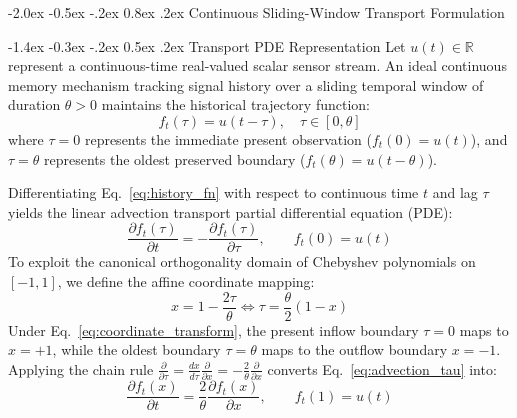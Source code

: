 \documentclass[10pt,twocolumn,a4paper]{article}
\makeatletter
\renewcommand\section{\@startsection{section}{1}{\z@}%
  {-2.0ex \@plus -0.5ex \@minus -.2ex}%
  {0.8ex \@plus .2ex}%
  {\normalfont\large\bfseries}}
\renewcommand\subsection{\@startsection{subsection}{2}{\z@}%
  {-1.4ex \@plus -0.3ex \@minus -.2ex}%
  {0.5ex \@plus .2ex}%
  {\normalfont\normalsize\bfseries}}
\theoremstyle{plain}
\theoremstyle{definition}
\makeatother
\begin{document}
\section{Continuous Sliding-Window Transport Formulation}

\subsection{Transport PDE Representation}
Let $u(t) \in \mathbb{R}$ represent a continuous-time real-valued scalar sensor stream. An ideal continuous memory mechanism tracking signal history over a sliding temporal window of duration $\theta > 0$ maintains the historical trajectory function:
\begin{equation}
f_t(\tau) = u(t - \tau), \quad \tau \in [0, \theta]
\label{eq:history_fn}
\end{equation}
where $\tau = 0$ represents the immediate present observation ($f_t(0) = u(t)$), and $\tau = \theta$ represents the oldest preserved boundary ($f_t(\theta) = u(t - \theta)$).

Differentiating Eq.~\eqref{eq:history_fn} with respect to continuous time $t$ and lag $\tau$ yields the linear advection transport partial differential equation (PDE):
\begin{equation}
\frac{\partial f_t(\tau)}{\partial t} = -\frac{\partial f_t(\tau)}{\partial \tau}, \qquad f_t(0) = u(t)
\label{eq:advection_tau}
\end{equation}
To exploit the canonical orthogonality domain of Chebyshev polynomials on $[-1, 1]$, we define the affine coordinate mapping:
\begin{equation}
x = 1 - \frac{2\tau}{\theta} \iff \tau = \frac{\theta}{2}(1 - x)
\label{eq:coordinate_transform}
\end{equation}
Under Eq.~\eqref{eq:coordinate_transform}, the present inflow boundary $\tau = 0$ maps to $x = +1$, while the oldest boundary $\tau = \theta$ maps to the outflow boundary $x = -1$. Applying the chain rule $\frac{\partial}{\partial \tau} = \frac{dx}{d\tau} \frac{\partial}{\partial x} = -\frac{2}{\theta} \frac{\partial}{\partial x}$ converts Eq.~\eqref{eq:advection_tau} into:
\begin{equation}
\frac{\partial f_t(x)}{\partial t} = \frac{2}{\theta} \frac{\partial f_t(x)}{\partial x}, \qquad f_t(1) = u(t)
\label{eq:advection_x}
\end{equation}
\end{document}
